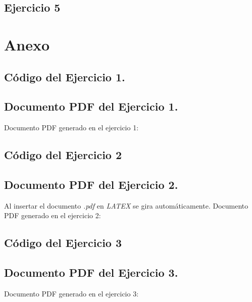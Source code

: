 \documentclass[a4paper]{article}
\begin{document}
\subsection{Ejercicio 5}\label{subsec:ej5}




\newpage
\section{Anexo}\label{anexo:an}
\subsection{Código del Ejercicio 1.} \label{anexo:ej1} 


\subsection{Documento PDF del Ejercicio 1.} \label{anexo:pdf1}
Documento PDF generado en el ejercicio 1:


\subsection{Código del Ejercicio 2} \label{anexo:ej2} 


\subsection{Documento PDF del Ejercicio 2.} \label{anexo:pdf2}
Al insertar el documento \textit{.pdf} en \textit{LATEX} se gira automáticamente. Documento PDF generado en el ejercicio 2:


\subsection{Código del Ejercicio 3} \label{anexo:ej3} 


\subsection{Documento PDF del Ejercicio 3.} \label{anexo:pdf3}
Documento PDF generado en el ejercicio 3:

\end{document}
